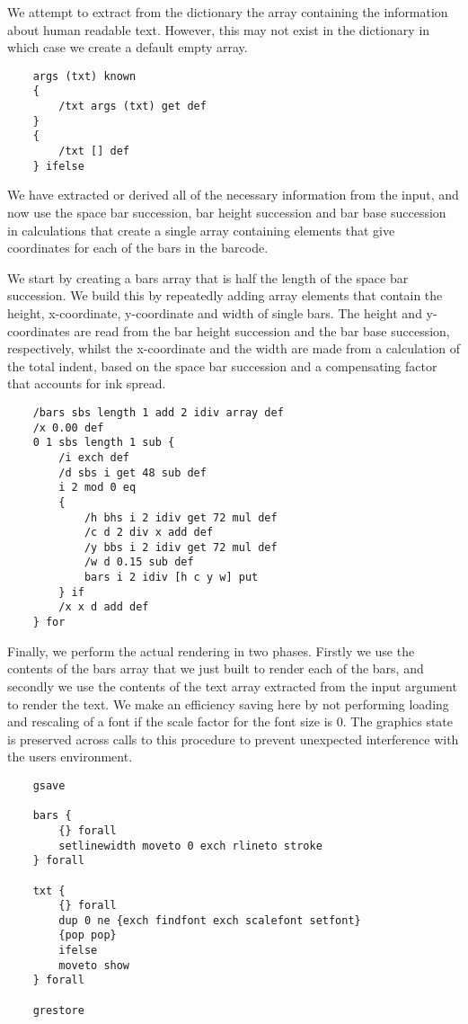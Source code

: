 \documentclass[11pt,english,BCOR10mm,DIV12,bibliography=totoc,parskip=false,smallheadings
    headexclude,footexclude,oneside]{pst-doc}
\begin{document}
We attempt to extract from the dictionary the array containing the
information about human readable text. However, this may not exist 
in the dictionary in which case we create a default empty array.

\begin{lstlisting}
    args (txt) known
    {
        /txt args (txt) get def
    }
    {
        /txt [] def
    } ifelse
\end{lstlisting}

We have extracted or derived all of the necessary information 
from the input, and now use the space bar succession, bar height 
succession and bar base succession in calculations that create a 
single array containing elements that give coordinates for each of
the bars in the barcode.

We start by creating a bars array that is half the length of the 
space bar succession. We build this by repeatedly adding array elements 
that contain the height, x-coordinate, y-coordinate and width of
single bars. The height and y-coordinates are read from the bar
height succession and the bar base succession, respectively, whilst
the x-coordinate and the width are made from a calculation of the 
total indent, based on the space bar succession and a compensating
factor that accounts for ink spread.

\begin{lstlisting}    
    /bars sbs length 1 add 2 idiv array def
    /x 0.00 def
    0 1 sbs length 1 sub {
        /i exch def
        /d sbs i get 48 sub def
        i 2 mod 0 eq
        {
            /h bhs i 2 idiv get 72 mul def
            /c d 2 div x add def
            /y bbs i 2 idiv get 72 mul def
            /w d 0.15 sub def            
            bars i 2 idiv [h c y w] put
        } if
        /x x d add def  
    } for
\end{lstlisting}

Finally, we perform the actual rendering in two phases. Firstly we
use the contents of the bars array that we just built to render each 
of the bars, and secondly we use the contents of the text array 
extracted from the input argument to render the
text. We make an efficiency saving here by not performing loading and
rescaling of a font if the scale factor for the font size is 0. The graphics
state is preserved across calls to this procedure to prevent 
unexpected interference with the users environment.

\begin{lstlisting}
    gsave
    
    bars {
        {} forall
        setlinewidth moveto 0 exch rlineto stroke
    } forall
    
    txt {
        {} forall
        dup 0 ne {exch findfont exch scalefont setfont} 
        {pop pop} 
        ifelse
        moveto show
    } forall

    grestore
\end{lstlisting}
\end{document}
